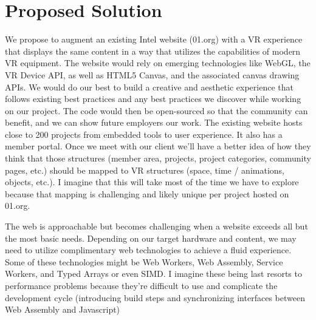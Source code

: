 \documentclass[draftclsnofoot,onecolumn]{IEEEtran}
\begin{document}
\section{Proposed Solution}
\par We propose to augment an existing Intel website (01.org) with a VR experience that displays the same content in a way that utilizes the capabilities of modern VR equipment.  The website would rely on emerging technologies like WebGL, the VR Device API, as well as HTML5 Canvas, and the associated canvas drawing APIs.  We would do our best to build a creative and aesthetic experience that follows existing best practices and any best practices we discover while working on our project.  The code would then be open-sourced so that the community can benefit, and we can show future employers our work.  The existing website hosts close to 200 projects from embedded tools to user experience.  It also has a member portal.  Once we meet with our client we’ll have a better idea of how they think that those structures (member area, projects, project categories, community pages, etc.) should be mapped to VR structures (space, time / animations, objects, etc.).  I imagine that this will take most of the time we have to explore because that mapping is challenging and likely unique per project hosted on 01.org.

\par The web is approachable but becomes challenging when a website exceeds all but the most basic needs.  Depending on our target hardware and content, we may need to utilize complimentary web technologies to achieve a fluid experience.  Some of these technologies might be Web Workers, Web Assembly, Service Workers, and Typed Arrays or even SIMD.  I imagine these being last resorts to performance problems because they’re difficult to use and complicate the development cycle (introducing build steps and synchronizing interfaces between Web Assembly and Javascript)
\end{document}
